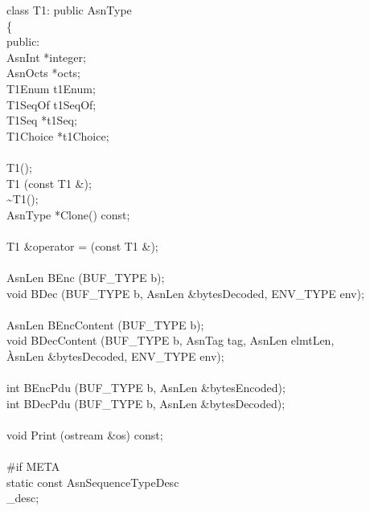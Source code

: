 \begin{Ccode}
class T1: public AsnType\\
\{\\
public:\+\\
  AsnInt    \>\>*integer;\\
  AsnOcts   \>\>*octs;\\
  T1Enum    \>\>t1Enum;\\
  T1SeqOf   \>\>t1SeqOf;\\
  T1Seq     \>\>*t1Seq;\\
  T1Choice  \>\>*t1Choice;\\
\\
            \>\>T1();\\
	    \>\>T1 (const T1 \&);\\
	    \>\>\~{}T1();\\
  AsnType   \>\>*Clone() const;\\
\\
  T1        \>\>\&operator = (const T1 \&);\\
\\
  AsnLen    \>\>BEnc (BUF\_TYPE b);\\
  void      \>\>BDec (BUF\_TYPE b, AsnLen \&bytesDecoded, ENV\_TYPE env);\\
\\
  AsnLen    \>\>BEncContent (BUF\_TYPE b);\\
  void      \>\>BDecContent (BUF\_TYPE b, AsnTag tag, AsnLen elmtLen,\\
                         \`AsnLen \&bytesDecoded, ENV\_TYPE env);\\
\\
  int       \>\>BEncPdu (BUF\_TYPE b, AsnLen \&bytesEncoded);\\
  int       \>\>BDecPdu (BUF\_TYPE b, AsnLen \&bytesDecoded);\\
\\
  void      \>\>Print (ostream \&os) const;\\
\\
\<\#if META\\
  static const AsnSequenceTypeDesc     \\
				\>\>\_desc;\\

\end{Ccode}
